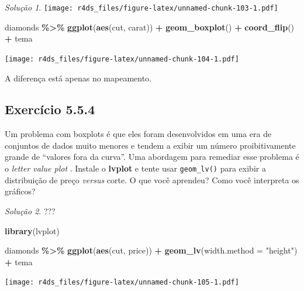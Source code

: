 \documentclass[
]{latex/krantz}
\newenvironment{Shaded}{\begin{snugshade}}{\end{snugshade}}
\newcommand{\AttributeTok}[1]{\textcolor[rgb]{0.13,0.29,0.53}{#1}}
\newcommand{\FunctionTok}[1]{\textcolor[rgb]{0.13,0.29,0.53}{\textbf{#1}}}
\newcommand{\NormalTok}[1]{#1}
\newcommand{\SpecialCharTok}[1]{\textcolor[rgb]{0.81,0.36,0.00}{\textbf{#1}}}
\newcommand{\StringTok}[1]{\textcolor[rgb]{0.31,0.60,0.02}{#1}}
\theoremstyle{definition}
\theoremstyle{definition}
\theoremstyle{definition}
\theoremstyle{definition}
\theoremstyle{remark}
\newtheorem*{solution}{Solução}
\begin{document}
\begin{solution}
\texttt{[image: r4ds\_files/figure-latex/unnamed-chunk-103-1.pdf]}

\begin{Shaded}
\begin{Highlighting}[]
\NormalTok{diamonds }\SpecialCharTok{\%\textgreater{}\%}
    \FunctionTok{ggplot}\NormalTok{(}\FunctionTok{aes}\NormalTok{(cut, carat)) }\SpecialCharTok{+}
        \FunctionTok{geom\_boxplot}\NormalTok{() }\SpecialCharTok{+}
        \FunctionTok{coord\_flip}\NormalTok{() }\SpecialCharTok{+}
\NormalTok{        tema}
\end{Highlighting}
\end{Shaded}

\texttt{[image: r4ds\_files/figure-latex/unnamed-chunk-104-1.pdf]}

A diferença está apenas no mapeamento.

\end{solution}

\hypertarget{exr5-5-4}{%
\subsection*{Exercício 5.5.4}\label{exr5-5-4}}

Um problema com boxplots é que eles foram desenvolvidos em uma era de conjuntos de dados muito menores e tendem a exibir um número proibitivamente grande de ``valores fora da curva''. Uma abordagem para remediar esse problema é o \emph{letter value plot} . Instale o \textbf{lvplot} e tente usar \texttt{geom\_lv()} para exibir a distribuição de preço \emph{versus} corte. O que você aprendeu? Como você interpreta os gráficos?

\begin{solution}
???

\begin{Shaded}
\begin{Highlighting}[]
\FunctionTok{library}\NormalTok{(lvplot)}

\NormalTok{diamonds }\SpecialCharTok{\%\textgreater{}\%}
    \FunctionTok{ggplot}\NormalTok{(}\FunctionTok{aes}\NormalTok{(cut, price)) }\SpecialCharTok{+}
        \FunctionTok{geom\_lv}\NormalTok{(}\AttributeTok{width.method =} \StringTok{"height"}\NormalTok{) }\SpecialCharTok{+}        
\NormalTok{        tema}
\end{Highlighting}
\end{Shaded}

\texttt{[image: r4ds\_files/figure-latex/unnamed-chunk-105-1.pdf]}
\end{solution}
\end{document}
